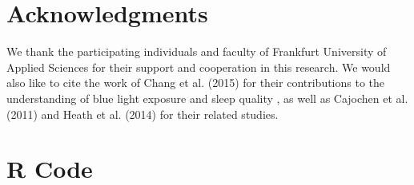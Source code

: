 \documentclass[conference]{IEEEtran}
\begin{document}
\section{Acknowledgments}
We thank the participating individuals and faculty of Frankfurt University of Applied Sciences for their support and cooperation in this research. We would also like to cite the work of Chang et al. (2015) for their contributions to the understanding of blue light exposure and sleep quality \cite{chang2015}, as well as Cajochen et al. (2011) \cite{cajochen2011} and Heath et al. (2014) \cite{heath2014} for their related studies.



\newpage
\appendix
\section{R Code}
\end{document}
